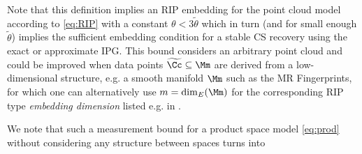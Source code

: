 Note that this definition implies an RIP embedding for the point cloud model according to \eqref{eq:RIP} with a constant $\theta<3\widetilde \theta$ which in turn (and for small enough $\widetilde \theta$) implies the sufficient embedding condition for a stable CS recovery using the exact or approximate IPG. %
This bound considers an arbitrary point cloud and could be improved when data points $\widetilde \Cc\subseteq \Mm$ are derived from a low-dimensional structure, e.g. a smooth manifold $\Mm$ such as the MR Fingerprints, for which one can alternatively use $m=\dim_{E}(\Mm)$ for the corresponding RIP type \emph{embedding dimension} listed e.g. in \cite{RichCSreview}.



%
		
We note that such a measurement bound for a product space model  \eqref{eq:prod}  without considering any structure between spaces turns into 



